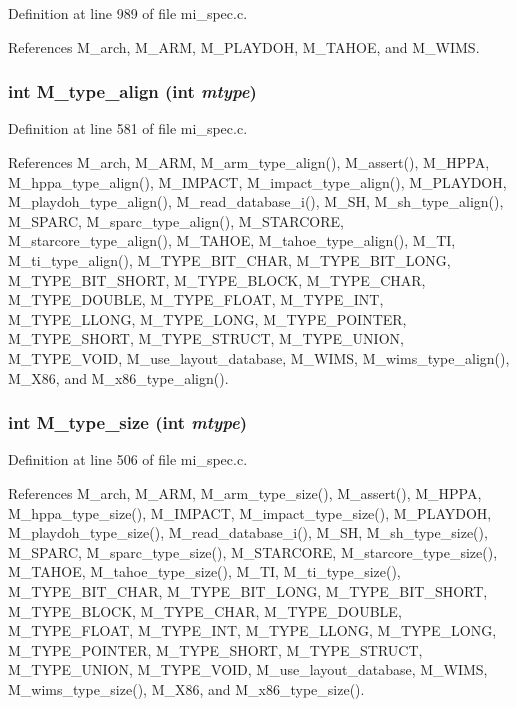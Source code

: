 Definition at line 989 of file mi\_\-spec.c.

References M\_\-arch, M\_\-ARM, M\_\-PLAYDOH, M\_\-TAHOE, and M\_\-WIMS.
\subsubsection{\setlength{\rightskip}{0pt plus 5cm}int M\_\-type\_\-align (int {\em mtype})}\label{m__spec_8h_2f6d63b07dd89b867bbcc843075b639e}




Definition at line 581 of file mi\_\-spec.c.

References M\_\-arch, M\_\-ARM, M\_\-arm\_\-type\_\-align(), M\_\-assert(), M\_\-HPPA, M\_\-hppa\_\-type\_\-align(), M\_\-IMPACT, M\_\-impact\_\-type\_\-align(), M\_\-PLAYDOH, M\_\-playdoh\_\-type\_\-align(), M\_\-read\_\-database\_\-i(), M\_\-SH, M\_\-sh\_\-type\_\-align(), M\_\-SPARC, M\_\-sparc\_\-type\_\-align(), M\_\-STARCORE, M\_\-starcore\_\-type\_\-align(), M\_\-TAHOE, M\_\-tahoe\_\-type\_\-align(), M\_\-TI, M\_\-ti\_\-type\_\-align(), M\_\-TYPE\_\-BIT\_\-CHAR, M\_\-TYPE\_\-BIT\_\-LONG, M\_\-TYPE\_\-BIT\_\-SHORT, M\_\-TYPE\_\-BLOCK, M\_\-TYPE\_\-CHAR, M\_\-TYPE\_\-DOUBLE, M\_\-TYPE\_\-FLOAT, M\_\-TYPE\_\-INT, M\_\-TYPE\_\-LLONG, M\_\-TYPE\_\-LONG, M\_\-TYPE\_\-POINTER, M\_\-TYPE\_\-SHORT, M\_\-TYPE\_\-STRUCT, M\_\-TYPE\_\-UNION, M\_\-TYPE\_\-VOID, M\_\-use\_\-layout\_\-database, M\_\-WIMS, M\_\-wims\_\-type\_\-align(), M\_\-X86, and M\_\-x86\_\-type\_\-align().
\subsubsection{\setlength{\rightskip}{0pt plus 5cm}int M\_\-type\_\-size (int {\em mtype})}\label{m__spec_8h_cad2efb034ba16e5120a93383b5d8592}




Definition at line 506 of file mi\_\-spec.c.

References M\_\-arch, M\_\-ARM, M\_\-arm\_\-type\_\-size(), M\_\-assert(), M\_\-HPPA, M\_\-hppa\_\-type\_\-size(), M\_\-IMPACT, M\_\-impact\_\-type\_\-size(), M\_\-PLAYDOH, M\_\-playdoh\_\-type\_\-size(), M\_\-read\_\-database\_\-i(), M\_\-SH, M\_\-sh\_\-type\_\-size(), M\_\-SPARC, M\_\-sparc\_\-type\_\-size(), M\_\-STARCORE, M\_\-starcore\_\-type\_\-size(), M\_\-TAHOE, M\_\-tahoe\_\-type\_\-size(), M\_\-TI, M\_\-ti\_\-type\_\-size(), M\_\-TYPE\_\-BIT\_\-CHAR, M\_\-TYPE\_\-BIT\_\-LONG, M\_\-TYPE\_\-BIT\_\-SHORT, M\_\-TYPE\_\-BLOCK, M\_\-TYPE\_\-CHAR, M\_\-TYPE\_\-DOUBLE, M\_\-TYPE\_\-FLOAT, M\_\-TYPE\_\-INT, M\_\-TYPE\_\-LLONG, M\_\-TYPE\_\-LONG, M\_\-TYPE\_\-POINTER, M\_\-TYPE\_\-SHORT, M\_\-TYPE\_\-STRUCT, M\_\-TYPE\_\-UNION, M\_\-TYPE\_\-VOID, M\_\-use\_\-layout\_\-database, M\_\-WIMS, M\_\-wims\_\-type\_\-size(), M\_\-X86, and M\_\-x86\_\-type\_\-size().

